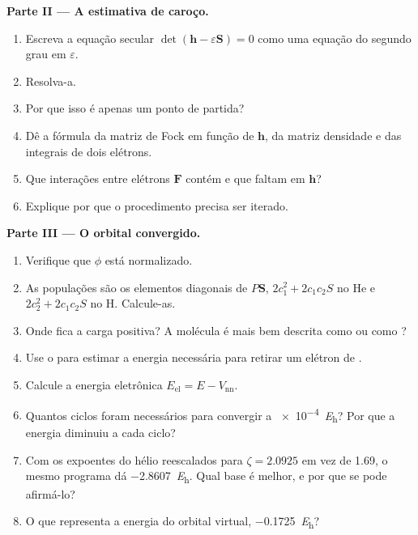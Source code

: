 \begin{problem}
\medskip\noindent\textbf{Parte II --- A estimativa de caroço.}
\begin{enumerate}[resume]
  \item Escreva a equação secular $\det(\mathbf h - \varepsilon\mathbf S) = 0$ como
        uma equação do segundo grau em $\varepsilon$.
  \item Resolva-a.
  \item Por que isso é apenas um ponto de partida?
  \item Dê a fórmula da matriz de Fock em função de $\mathbf h$, da
        matriz densidade e das integrais de dois elétrons.
  \item Que interações entre elétrons $\mathbf F$ contém e que faltam em $\mathbf h$?
  \item Explique por que o procedimento precisa ser iterado.
\end{enumerate}

\medskip\noindent\textbf{Parte III --- O orbital convergido.}
\begin{enumerate}[resume]
  \item Verifique que $\phi$ está normalizado.
  \item As populações são os elementos diagonais de $P\mathbf S$, $2c_1^2 + 2c_1c_2S$
        no He e $2c_2^2 + 2c_1c_2S$ no H. Calcule-as.
  \item Onde fica a carga positiva? A molécula é mais bem descrita
        como  ou como ?
  \item Use o  para estimar a energia necessária para retirar
        um elétron de .
  \item Calcule a energia eletrônica $E_{\mathrm{el}} = E - V_{\mathrm{nn}}$.
  \item Quantos ciclos foram necessários para convergir a \qty{e-4}{\hartree}? Por que
        a energia diminuiu a cada ciclo?
  \item Com os expoentes do hélio reescalados para $\zeta = 2.0925$ em vez de 1.69, o
        mesmo programa dá \qty{-2.8607}{\hartree}. Qual base é melhor, e
        por que se pode afirmá-lo?
  \item O que representa a energia do orbital virtual, \qty{-0.1725}{\hartree}?
\end{enumerate}


\end{problem}
